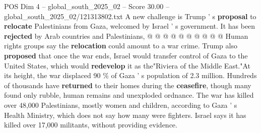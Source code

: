 \begin{textsample}{POS Dim 4 – global\_south\_2025\_02 – Score 30.00 – global\_south\_2025\_02/121313802.txt}
A new challenge is Trump ' s \textbf{proposal} to \textbf{relocate} Palestinians from Gaza, welcomed by Israel ' s government.
It has been \textbf{rejected} by Arab countries and Palestinians, @ @ @ @ @ @ @ @ @ @ Human rights groups say the \textbf{relocation} could amount to a war crime.
Trump also \textbf{proposed} that once the war ends, Israel would transfer control of Gaza to the United States, which would \textbf{redevelop} it as the"Riviera of the Middle East."At its height, the war displaced 90 \% of Gaza ' s population of 2.3 million.
Hundreds of thousands have \textbf{returned} to their homes during the \textbf{ceasefire}, though many found only rubble, human remains and unexploded ordnance.
The war has killed over 48,000 Palestinians, mostly women and children, according to Gaza ' s Health Ministry, which does not say how many were fighters.
Israel says it has killed over 17,000 militants, without providing evidence.

\end{textsample}

